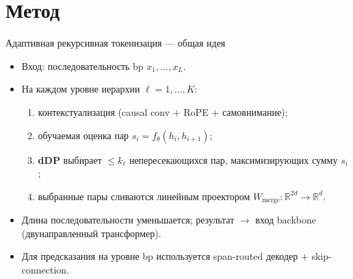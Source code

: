 \documentclass[aspectratio=169,xcolor=table]{beamer}
\begin{document}
\section{Метод}

\begin{frame}{Адаптивная рекурсивная токенизация --- общая идея}
  \begin{itemize}
    \item Вход: последовательность bp $x_1, \dots, x_L$.
    \item На каждом уровне иерархии $\ell = 1, \dots, K$:
      \begin{enumerate}
        \item контекстуализация (causal conv + RoPE + само\-внимание);
        \item обучаемая оценка пар $s_i = f_\theta(h_i, h_{i+1})$;
        \item \textbf{dDP} выбирает $\le k_\ell$ непересекающихся пар,
              максимизирующих сумму $s_i$;
        \item выбранные пары сливаются линейным проектором
              $W_{\text{merge}}: \mathbb{R}^{2d} \to \mathbb{R}^{d}$.
      \end{enumerate}
    \item Длина последовательности уменьшается; результат $\to$ вход
          backbone (двунаправленный трансформер).
    \item Для предсказания на уровне bp используется span-routed декодер
          + skip-connection.
  \end{itemize}
\end{frame}
\end{document}
